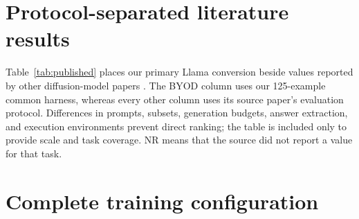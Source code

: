 \documentclass{article}
\begin{document}
\appendix
\section{Protocol-separated literature results}
\label{app:published-results}

Table~\ref{tab:published} places our primary Llama conversion beside values reported by other diffusion-model papers \citep{nie2025llada,ye2025dream,nie2026illada,fu2025efficientdlm}. The BYOD column uses our 125-example common harness, whereas every other column uses its source paper's evaluation protocol. Differences in prompts, subsets, generation budgets, answer extraction, and execution environments prevent direct ranking; the table is included only to provide scale and task coverage. NR means that the source did not report a value for that task.

\begin{table}[h]
\caption{Our Llama result and protocol-separated published diffusion-model accuracies. Bold marks the largest reported value in each row; it does not imply a controlled comparison. No cross-task averages are shown because task coverage differs by model.}
\label{tab:published}
\centering
\scriptsize
{}
\end{table}

\section{Complete training configuration}
\label{app:training-settings}
\end{document}
